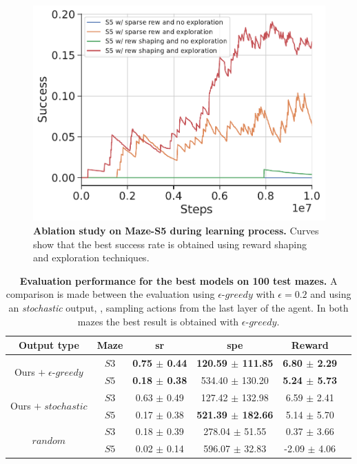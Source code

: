 \begin{figure}
    \centering
    \includegraphics[width=0.8\linewidth]{figures/understanding_vsn/S5_ablation_success}
    \caption{\textbf{Ablation study on Maze-S5 during learning process.} Curves show that the best success rate is obtained using reward shaping and exploration techniques.}
    \label{fig:ablation-maze-success}
\end{figure}

\begin{table}
    \centering
    \begin{tabular}{c c c c c c}
        \toprule
        Output type                                        & Maze & \acrshort{sr}            & \acrshort{spe}               & Reward                   \\
        \midrule
        \multirow{2}{*}{Ours $+\; \epsilon\text{-}greedy$} & $S3$ & \textbf{0.75 $\pm$ 0.44} & \textbf{120.59 $\pm$ 111.85} & \textbf{6.80 $\pm$ 2.29} \\
        & $S5$ & \textbf{0.18 $\pm$ 0.38} & 534.40 $\pm$ 130.20          & \textbf{5.24 $\pm$ 5.73} \\
        \multirow{2}{*}{Ours $+\; stochastic$}             & $S3$ & 0.63 $\pm$ 0.49          & 127.42 $\pm$ 132.98          & 6.59 $\pm$ 2.41          \\
        & $S5$ & 0.17 $\pm$ 0.38          & \textbf{521.39 $\pm$ 182.66} & 5.14 $\pm$ 5.70          \\
        \multirow{2}{*}{$random$}                          & $S3$ & 0.18 $\pm$ 0.39          & 278.04 $\pm$ 51.55           & 0.37 $\pm$ 3.66          \\
        & $S5$ & 0.02 $\pm$ 0.14          & 596.07 $\pm$ 32.83           & -2.09 $\pm$ 4.06         \\
        \bottomrule
    \end{tabular}
    \caption{\textbf{Evaluation performance for the best models on 100 test mazes.} A comparison is made between the evaluation using $\epsilon\text{-}greedy$ with $\epsilon=0.2$ and using an \textit{stochastic} output, \ie, sampling actions from the last layer of the agent. In both mazes the best result is obtained with $\epsilon\text{-}greedy$.}
    \label{tab:results-maze}
\end{table}

